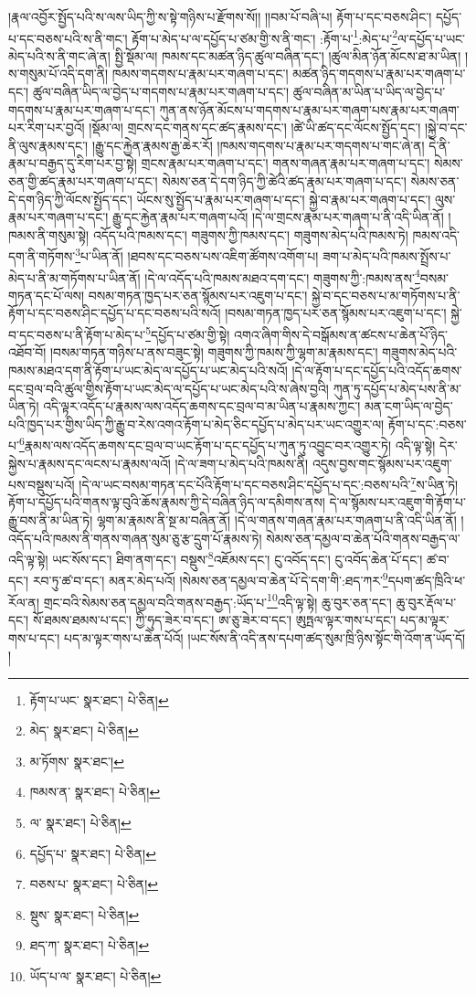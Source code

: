 །རྣལ་འབྱོར་སྤྱོད་པའི་ས་ལས་ཡིད་ཀྱི་ས་སྟེ་གཉིས་པ་རྫོགས་སོ།། །།བམ་པོ་བཞི་པ། རྟོག་པ་དང་བཅས་ཤིང་། དཔྱོད་པ་དང་བཅས་པའི་ས་ནི་གང་། རྟོག་པ་མེད་པ་ལ་དཔྱོད་པ་ཙམ་གྱི་ས་ནི་གང་། :རྟོག་པ་\footnote{རྟོག་པ་ཡང་  སྣར་ཐང་།  པེ་ཅིན། }:མེད་པ་\footnote{མེད་  སྣར་ཐང་།  པེ་ཅིན། }ལ་དཔྱོད་པ་ཡང་མེད་པའི་ས་ནི་གང་ཞེ་ན། སྤྱི་སྡོམ་ལ། ཁམས་དང་མཚན་ཉིད་ཚུལ་བཞིན་དང་། །ཚུལ་མིན་ཉོན་མོངས་ཐ་མ་ཡིན། །ས་གསུམ་པོ་འདི་དག་ནི། ཁམས་གདགས་པ་རྣམ་པར་གཞག་པ་དང་། མཚན་ཉིད་གདགས་པ་རྣམ་པར་གཞག་པ་དང་། ཚུལ་བཞིན་ཡིད་ལ་བྱེད་པ་གདགས་པ་རྣམ་པར་གཞག་པ་དང་། ཚུལ་བཞིན་མ་ཡིན་པ་ཡིད་ལ་བྱེད་པ་གདགས་པ་རྣམ་པར་གཞག་པ་དང་། ཀུན་ནས་ཉོན་མོངས་པ་གདགས་པ་རྣམ་པར་གཞག་པས་རྣམ་པར་གཞག་པར་རིག་པར་བྱའོ། །སྡོམ་ལ། གྲངས་དང་གནས་དང་ཚད་རྣམས་དང་། །ཚེ་ཡི་ཚད་དང་ལོངས་སྤྱོད་དང་། །སྐྱེ་བ་དང་ནི་ལུས་རྣམས་དང་། །རྒྱུ་དང་རྐྱེན་རྣམས་རྒྱ་ཆེར་རོ། །ཁམས་གདགས་པ་རྣམ་པར་གདགས་པ་གང་ཞེ་ན། དེ་ནི་རྣམ་པ་བརྒྱད་དུ་རིག་པར་བྱ་སྟེ། གྲངས་རྣམ་པར་གཞག་པ་དང་། གནས་གཞན་རྣམ་པར་གཞག་པ་དང་། སེམས་ཅན་གྱི་ཚད་རྣམ་པར་གཞག་པ་དང་། སེམས་ཅན་དེ་དག་ཉིད་ཀྱི་ཚེའི་ཚད་རྣམ་པར་གཞག་པ་དང་། སེམས་ཅན་དེ་དག་ཉིད་ཀྱི་ལོངས་སྤྱོད་དང་། ཡོངས་སུ་སྤྱོད་པ་རྣམ་པར་གཞག་པ་དང་། སྐྱེ་བ་རྣམ་པར་གཞག་པ་དང་། ལུས་རྣམ་པར་གཞག་པ་དང་། རྒྱུ་དང་རྐྱེན་རྣམ་པར་གཞག་པའོ། །དེ་ལ་གྲངས་རྣམ་པར་གཞག་པ་ནི་འདི་ཡིན་ནོ། །ཁམས་ནི་གསུམ་སྟེ། འདོད་པའི་ཁམས་དང་། གཟུགས་ཀྱི་ཁམས་དང་། གཟུགས་མེད་པའི་ཁམས་ཏེ། ཁམས་འདི་དག་ནི་གཏོགས་\footnote{མ་ཏོགས་  སྣར་ཐང་། }པ་ཡིན་ནོ། །ཐབས་དང་བཅས་པས་འཇིག་ཚོགས་འགོག་པ། ཟག་པ་མེད་པའི་ཁམས་སྤྲོས་པ་མེད་པ་ནི་མ་གཏོགས་པ་ཡིན་ནོ། །དེ་ལ་འདོད་པའི་ཁམས་མཐའ་དག་དང་། གཟུགས་ཀྱི་:ཁམས་ནས་\footnote{ཁམས་ན་  སྣར་ཐང་།  པེ་ཅིན། }བསམ་གཏན་དང་པོ་ལས། བསམ་གཏན་ཁྱད་པར་ཅན་སྙོམས་པར་འཇུག་པ་དང་། སྐྱེ་བ་དང་བཅས་པ་མ་གཏོགས་པ་ནི་རྟོག་པ་དང་བཅས་ཤིང་དཔྱོད་པ་དང་བཅས་པའི་སའོ། །བསམ་གཏན་ཁྱད་པར་ཅན་སྙོམས་པར་འཇུག་པ་དང་། སྐྱེ་བ་དང་བཅས་པ་ནི་རྟོག་པ་མེད་པ་\footnote{ལ་  སྣར་ཐང་།  པེ་ཅིན། }དཔྱོད་པ་ཙམ་གྱི་སྟེ། འགའ་ཞིག་གིས་དེ་བསྒོམས་ན་ཚངས་པ་ཆེན་པོ་ཉིད་འཐོབ་བོ། །བསམ་གཏན་གཉིས་པ་ནས་བཟུང་སྟེ། གཟུགས་ཀྱི་ཁམས་ཀྱི་ལྷག་མ་རྣམས་དང་། གཟུགས་མེད་པའི་ཁམས་མཐའ་དག་ནི་རྟོག་པ་ཡང་མེད་ལ་དཔྱོད་པ་ཡང་མེད་པའི་སའོ། །དེ་ལ་རྟོག་པ་དང་དཔྱོད་པའི་འདོད་ཆགས་དང་བྲལ་བའི་ཚུལ་གྱིས་རྟོག་པ་ཡང་མེད་ལ་དཔྱོད་པ་ཡང་མེད་པའི་ས་ཞེས་བྱའི། ཀུན་ཏུ་དཔྱོད་པ་མེད་པས་ནི་མ་ཡིན་ཏེ། འདི་ལྟར་འདོད་པ་རྣམས་ལས་འདོད་ཆགས་དང་བྲལ་བ་མ་ཡིན་པ་རྣམས་ཀྱང་། མན་ངག་ཡིད་ལ་བྱེད་པའི་ཁྱད་པར་གྱིས་ཡིད་ཀྱི་རྒྱུ་བ་རེས་འགའ་རྟོག་པ་མེད་ཅིང་དཔྱོད་པ་མེད་པར་ཡང་འགྱུར་ལ། རྟོག་པ་དང་:བཅས་པ་\footnote{དཔྱོད་པ་  སྣར་ཐང་།  པེ་ཅིན། }རྣམས་ལས་འདོད་ཆགས་དང་བྲལ་བ་ཡང་རྟོག་པ་དང་དཔྱོད་པ་ཀུན་ཏུ་འབྱུང་བར་འགྱུར་ཏེ། འདི་ལྟ་སྟེ། དེར་སྐྱེས་པ་རྣམས་དང་ལངས་པ་རྣམས་ལའོ། །དེ་ལ་ཟག་པ་མེད་པའི་ཁམས་ནི། འདུས་བྱས་གང་སྙོམས་པར་འཇུག་པས་བསྡུས་པའོ། །དེ་ལ་ཡང་བསམ་གཏན་དང་པོའི་རྟོག་པ་དང་བཅས་ཤིང་དཔྱོད་པ་དང་:བཅས་པའི་\footnote{བཅས་པ་  སྣར་ཐང་།  པེ་ཅིན། }ས་ཡིན་ཏེ། རྟོག་པ་དཔྱོད་པའི་གནས་ལྟ་བུའི་ཆོས་རྣམས་ཀྱི་དེ་བཞིན་ཉིད་ལ་དམིགས་ནས། དེ་ལ་སྙོམས་པར་འཇུག་གི་རྟོག་པ་རྒྱུ་བས་ནི་མ་ཡིན་ཏེ། ལྷག་མ་རྣམས་ནི་སྔ་མ་བཞིན་ནོ། །དེ་ལ་གནས་གཞན་རྣམ་པར་གཞག་པ་ནི་འདི་ཡིན་ནོ། །འདོད་པའི་ཁམས་ནི་གནས་གཞན་སུམ་ཅུ་རྩ་དྲུག་པོ་རྣམས་ཏེ། སེམས་ཅན་དམྱལ་བ་ཆེན་པོའི་གནས་བརྒྱད་ལ་འདི་ལྟ་སྟེ། ཡང་སོས་དང་། ཐིག་ནག་དང་། བསྡུས་\footnote{སྡུས་  སྣར་ཐང་།  པེ་ཅིན། }འཇོམས་དང་། ངུ་འབོད་དང་། ངུ་འབོད་ཆེན་པོ་དང་། ཚ་བ་དང་། རབ་ཏུ་ཚ་བ་དང་། མནར་མེད་པའོ། །སེམས་ཅན་དམྱལ་བ་ཆེན་པོ་དེ་དག་གི་:ཐད་ཀར་\footnote{ཐད་ཀ་  སྣར་ཐང་།  པེ་ཅིན། }དཔག་ཚད་ཁྲིའི་ཕ་རོལ་ན། གྲང་བའི་སེམས་ཅན་དམྱལ་བའི་གནས་བརྒྱད་:ཡོད་པ་\footnote{ཡོད་པ་ལ་  སྣར་ཐང་།  པེ་ཅིན། }འདི་ལྟ་སྟེ། ཆུ་བུར་ཅན་དང་། ཆུ་བུར་རྡོལ་པ་དང་། སོ་ཐམས་ཐམས་པ་དང་། ཀྱི་ཧུད་ཟེར་བ་དང་། ཨ་ཅུ་ཟེར་བ་དང་། ཨུཏྤལ་ལྟར་གས་པ་དང་། པད་མ་ལྟར་གས་པ་དང་། པད་མ་ལྟར་གས་པ་ཆེན་པོའོ། །ཡང་སོས་ནི་འདི་ནས་དཔག་ཚད་སུམ་ཁྲི་ཉིས་སྟོང་གི་འོག་ན་ཡོད་དོ། །
